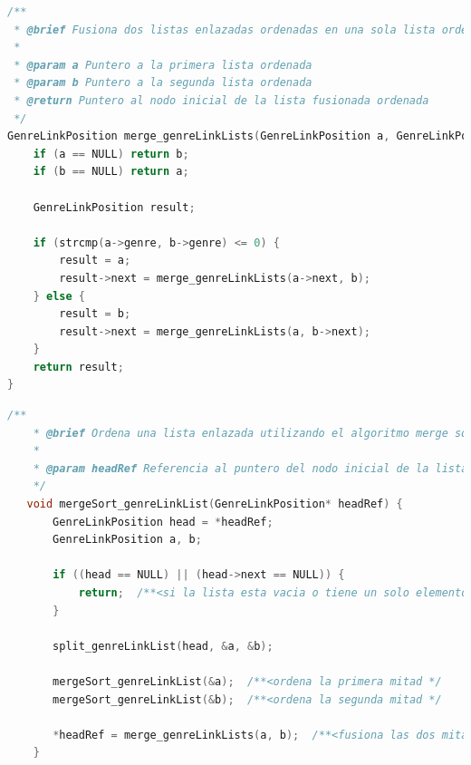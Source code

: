 \begin{lstlisting}[style=CodeStyle, language=C, caption={fusion de listas}, label={lst:codigo}]
    /**
 * @brief Fusiona dos listas enlazadas ordenadas en una sola lista ordenada
 *
 * @param a Puntero a la primera lista ordenada
 * @param b Puntero a la segunda lista ordenada
 * @return Puntero al nodo inicial de la lista fusionada ordenada
 */
GenreLinkPosition merge_genreLinkLists(GenreLinkPosition a, GenreLinkPosition b) {
    if (a == NULL) return b;
    if (b == NULL) return a;

    GenreLinkPosition result;

    if (strcmp(a->genre, b->genre) <= 0) {
        result = a;
        result->next = merge_genreLinkLists(a->next, b);
    } else {
        result = b;
        result->next = merge_genreLinkLists(a, b->next);
    }
    return result;
}
\end{lstlisting}

\begin{lstlisting}[style=CodeStyle, language=C, caption={mergerSort\_genreLinkList}, label={lst:codigo}]
    /**
    * @brief Ordena una lista enlazada utilizando el algoritmo merge sort.
    *
    * @param headRef Referencia al puntero del nodo inicial de la lista a ordenar.
    */
   void mergeSort_genreLinkList(GenreLinkPosition* headRef) {
       GenreLinkPosition head = *headRef;
       GenreLinkPosition a, b;
   
       if ((head == NULL) || (head->next == NULL)) {
           return;  /**<si la lista esta vacia o tiene un solo elemento, no hay que ordenar */ 
       }
   
       split_genreLinkList(head, &a, &b);
   
       mergeSort_genreLinkList(&a);  /**<ordena la primera mitad */
       mergeSort_genreLinkList(&b);  /**<ordena la segunda mitad */
   
       *headRef = merge_genreLinkLists(a, b);  /**<fusiona las dos mitades ordenadas */
    }
\end{lstlisting}


